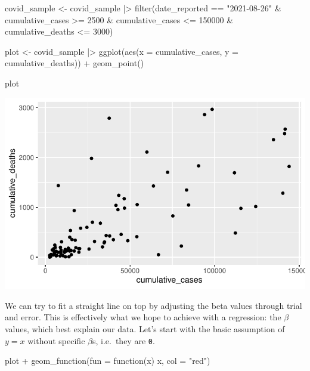 \documentclass[
  letterpaper,
]{krantz}
\makeatletter
\newenvironment{Shaded}{\begin{snugshade}}{\end{snugshade}}
\newcommand{\AttributeTok}[1]{\textcolor[rgb]{0.40,0.45,0.13}{#1}}
\newcommand{\ControlFlowTok}[1]{\textcolor[rgb]{0.00,0.23,0.31}{#1}}
\newcommand{\DecValTok}[1]{\textcolor[rgb]{0.68,0.00,0.00}{#1}}
\newcommand{\FunctionTok}[1]{\textcolor[rgb]{0.28,0.35,0.67}{#1}}
\newcommand{\NormalTok}[1]{\textcolor[rgb]{0.00,0.23,0.31}{#1}}
\newcommand{\OtherTok}[1]{\textcolor[rgb]{0.00,0.23,0.31}{#1}}
\newcommand{\SpecialCharTok}[1]{\textcolor[rgb]{0.37,0.37,0.37}{#1}}
\newcommand{\StringTok}[1]{\textcolor[rgb]{0.13,0.47,0.30}{#1}}
\newenvironment{kframe}{%
\medskip{}
\setlength{\fboxsep}{.8em}
 \def\at@end@of@kframe{}%
 \ifinner\ifhmode%
  \def\at@end@of@kframe{\end{minipage}}%
  \begin{minipage}{\columnwidth}%
 \fi\fi%
 \def\FrameCommand##1{\hskip\@totalleftmargin \hskip-\fboxsep
 \colorbox{shadecolor}{##1}\hskip-\fboxsep
     \hskip-\linewidth \hskip-\@totalleftmargin \hskip\columnwidth}%
 \MakeFramed {\advance\hsize-\width
   \@totalleftmargin\z@ \linewidth\hsize
   \@setminipage}}%
 {\par\unskip\endMakeFramed%
 \at@end@of@kframe}
\renewenvironment{Shaded}{\begin{kframe}}{\end{kframe}}
\makeatother
\begin{document}
\begin{Shaded}
\begin{Highlighting}[]
\NormalTok{covid\_sample }\OtherTok{\textless{}{-}}
\NormalTok{  covid\_sample }\SpecialCharTok{|\textgreater{}}
  \FunctionTok{filter}\NormalTok{(date\_reported }\SpecialCharTok{==} \StringTok{"2021{-}08{-}26"} \SpecialCharTok{\&}
\NormalTok{           cumulative\_cases }\SpecialCharTok{\textgreater{}=} \DecValTok{2500} \SpecialCharTok{\&}
\NormalTok{           cumulative\_cases }\SpecialCharTok{\textless{}=} \DecValTok{150000} \SpecialCharTok{\&}
\NormalTok{           cumulative\_deaths }\SpecialCharTok{\textless{}=} \DecValTok{3000}\NormalTok{)}

\NormalTok{plot }\OtherTok{\textless{}{-}}\NormalTok{ covid\_sample }\SpecialCharTok{|\textgreater{}}
  \FunctionTok{ggplot}\NormalTok{(}\FunctionTok{aes}\NormalTok{(}\AttributeTok{x =}\NormalTok{ cumulative\_cases,}
             \AttributeTok{y =}\NormalTok{ cumulative\_deaths)) }\SpecialCharTok{+}
  \FunctionTok{geom\_point}\NormalTok{()}

\NormalTok{plot}
\end{Highlighting}
\end{Shaded}

\includegraphics{13_regressions_files/figure-pdf/fitting-model-by hand-step-three-1.pdf}

We can try to fit a straight line on top by adjusting the beta values
through trial and error. This is effectively what we hope to achieve
with a regression: the \(\beta\) values, which best explain our data.
Let's start with the basic assumption of \(y = x\) without specific
\(\beta\)s, i.e.~they are \texttt{0}.

\begin{Shaded}
\begin{Highlighting}[]
\NormalTok{plot }\SpecialCharTok{+}
  \FunctionTok{geom\_function}\NormalTok{(}\AttributeTok{fun =} \ControlFlowTok{function}\NormalTok{(x) x, }\AttributeTok{col =} \StringTok{"red"}\NormalTok{)}
\end{Highlighting}
\end{Shaded}
\end{document}
